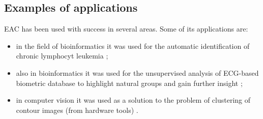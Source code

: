 \subsection{Examples of applications}

EAC has been used with success in several areas. Some of its applications are:
\begin{itemize}
    \item in the field of bioinformatics it was used for the automatic identification of chronic lymphocyt leukemia \cite{Qian2010};
    \item also in bioinformatics it was used for the unsupervised analysis of ECG-based biometric database to highlight natural groups and gain further insight \cite{LourencoECG2009};
    \item in computer vision it was used as a solution to the problem of clustering of contour images (from hardware tools) \cite{Lourenco2007}.
\end{itemize}


